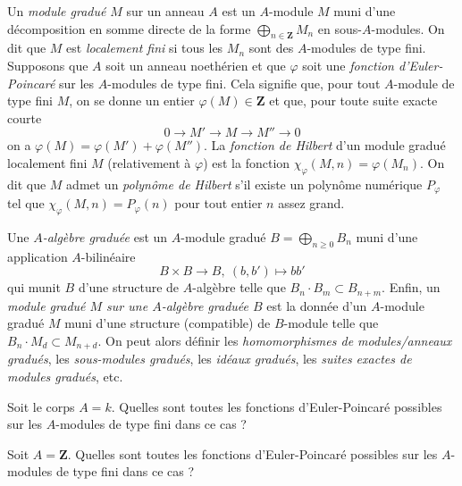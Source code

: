 \begin{definition}
\label{definition-graded-module}
Un {\it module gradué} $M$ sur un anneau $A$ est un $A$-module $M$
muni d'une décomposition en somme directe de la forme
$
\bigoplus\nolimits_{n \in {\mathbf Z}} M_n
$
en sous-$A$-modules. On dit que $M$ est {\it localement fini} si tous les
$M_n$ sont des $A$-modules de type fini. Supposons que $A$ soit un anneau noethérien et
que $\varphi$ soit une {\it fonction d'Euler-Poincar\'e} sur les $A$-modules de type fini.
Cela signifie que, pour tout $A$-module de type fini $M$, on se donne un
entier $\varphi(M) \in {\mathbf Z}$ et que, pour toute suite exacte courte
$$
0
\longrightarrow
M'
\longrightarrow
M
\longrightarrow
M''
\longrightarrow
0
$$
on a $\varphi(M) = \varphi(M') + \varphi(M'')$. La {\it fonction de Hilbert}
d'un module gradué localement fini $M$ (relativement à $\varphi$) est la
fonction $\chi_\varphi(M, n) = \varphi(M_n)$. On dit que $M$ admet un
{\it polynôme de Hilbert} s'il existe un polynôme numérique
$P_\varphi$ tel que $\chi_\varphi(M, n) = P_\varphi(n)$ pour tout entier $n$
assez grand.
\end{definition}

\begin{definition}
\label{definition-graded-algebra}
Une {\it $A$-algèbre graduée} est un $A$-module gradué
$B = \bigoplus_{n \geq 0} B_n$ muni d'une application $A$-bilinéaire
$$
B \times B \longrightarrow B, \ (b, b') \longmapsto bb'
$$
qui munit $B$ d'une structure de $A$-algèbre telle que $B_n \cdot B_m \subset B_{n + m}$.
Enfin, un {\it module gradué $M$ sur une $A$-algèbre graduée $B$} est la donnée
d'un $A$-module gradué $M$ muni d'une structure (compatible) de $B$-module
telle que $B_n \cdot M_d \subset M_{n + d}$. On peut alors définir les
{\it homomorphismes de modules/anneaux gradués}, les {\it sous-modules gradués},
les {\it idéaux gradués}, les {\it suites exactes de modules gradués}, etc.
\end{definition}

\begin{exercise}
\label{exercise-Euler-Poincare-field}
Soit le corps $A = k$. Quelles sont toutes les fonctions d'Euler-Poincar\'e
possibles sur les $A$-modules de type fini dans ce cas ?
\end{exercise}

\begin{exercise}
\label{exercise-Euler-Poincare-Z}
Soit $A ={\mathbf Z}$. Quelles sont toutes les fonctions d'Euler-Poincar\'e
possibles sur les $A$-modules de type fini dans ce cas ?
\end{exercise}


